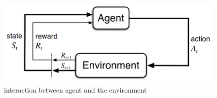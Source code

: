 \begin{figure}
	\centering
    \includegraphics[width=\linewidth,]{figures/background/agent-environment-interaction.png}
	\caption{interaction between agent and the environment}
	\label{fig:agent-environment_interaction}
	\endminipage
\end{figure}


